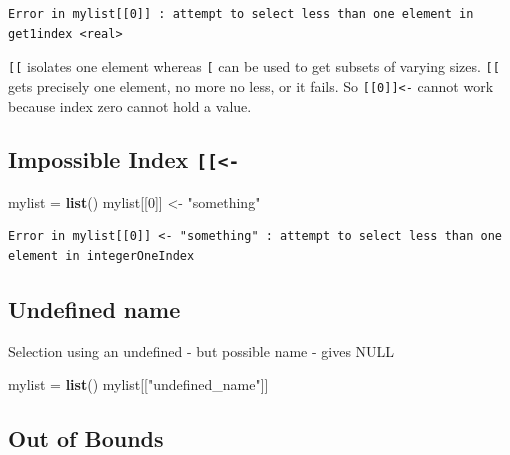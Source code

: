 \documentclass[]{book}
\newenvironment{Shaded}{\begin{snugshade}}{\end{snugshade}}
\newcommand{\DecValTok}[1]{\textcolor[rgb]{0.00,0.00,0.81}{#1}}
\newcommand{\KeywordTok}[1]{\textcolor[rgb]{0.13,0.29,0.53}{\textbf{#1}}}
\newcommand{\NormalTok}[1]{#1}
\newcommand{\StringTok}[1]{\textcolor[rgb]{0.31,0.60,0.02}{#1}}
\begin{document}
\begin{verbatim}
Error in mylist[[0]] : attempt to select less than one element in get1index <real>
\end{verbatim}

\texttt{{[}{[}} isolates one element whereas \texttt{{[}} can be used to get subsets of varying sizes.
\texttt{{[}{[}} gets precisely one element, no more no less, or it fails. So \texttt{{[}{[}0{]}{]}\textless{}-} cannot work because index zero cannot hold a value.

\hypertarget{impossible-index--}{%
\subsection*{\texorpdfstring{Impossible Index \texttt{{[}{[}\textless{}-}}{Impossible Index {[}{[}\textless{}-}}\label{impossible-index--}}
\addcontentsline{toc}{subsection}{Impossible Index \texttt{{[}{[}\textless{}-}}

\begin{Shaded}
\begin{Highlighting}[]
\NormalTok{mylist =}\StringTok{ }\KeywordTok{list}\NormalTok{()}
\NormalTok{mylist[[}\DecValTok{0}\NormalTok{]] <-}\StringTok{ "something"}
\end{Highlighting}
\end{Shaded}

\begin{verbatim}
Error in mylist[[0]] <- "something" : attempt to select less than one element in integerOneIndex
\end{verbatim}

\hypertarget{undefined-name}{%
\subsection*{Undefined name}\label{undefined-name}}

Selection using an undefined - but possible name - gives NULL

\begin{Shaded}
\begin{Highlighting}[]
\NormalTok{mylist =}\StringTok{ }\KeywordTok{list}\NormalTok{()}
\NormalTok{mylist[[}\StringTok{"undefined_name"}\NormalTok{]]}
\end{Highlighting}
\end{Shaded}

\hypertarget{out-of-bounds}{%
\subsection*{Out of Bounds}\label{out-of-bounds}}
\end{document}

